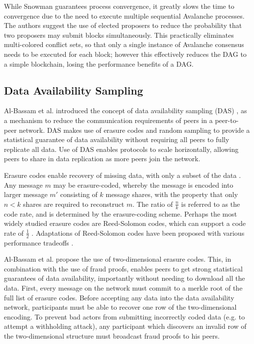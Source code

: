 \documentclass[12pt]{article}
\begin{document}
  While Snowman guarantees process convergence, it greatly slows the time to
  convergence due to the need to execute multiple sequential Avalanche
  processes. The authors suggest the use of elected proposers to reduce the
  probability that two proposers may submit blocks simultaneously. This
  practically eliminates multi-colored conflict sets, so that only a single
  instance of Avalanche consensus needs to be executed for each block; however
  this effectively reduces the DAG to a simple blockchain, losing the
  performance benefits of a DAG.

\subsection{Data Availability Sampling}
  Al-Bassam et al. introduced the concept of data availability sampling (DAS)
  \cite{albassam2019fraud}, as a mechanism to reduce the communication
  requirements of peers in a peer-to-peer network. DAS makes use of erasure
  codes and random sampling to provide a statistical guarantee of data
  availability without requiring all peers to fully replicate all data. Use of
  DAS enables protocols to scale horizontally, allowing peers to share in data
  replication as more peers join the network.

  Erasure codes enable recovery of missing data, with only a subset of the data
  \cite{peterson1972error}. Any message $m$ may be erasure-coded, whereby the
  message is encoded into larger message $m'$ consisting of $k$ message shares,
  with the property that only $n < k$ shares are required to reconstruct $m$.
  The ratio of $\frac{n}{k}$ is referred to as the code rate, and is determined
  by the erasure-coding scheme. Perhaps the most widely studied erasure codes
  are Reed-Solomon codes, which can support a code rate of $\frac{1}{2}$
  \cite{reedsolomon}. Adaptations of Reed-Solomon codes have been proposed with
  various performance tradeoffs \cite{dudek, saints, shea, wu}.

  Al-Bassam et al. propose the use of two-dimensional erasure codes. This, in
  combination with the use of fraud proofs, enables peers to get strong
  statistical guarantees of data availability, importantly without needing to
  download all the data. First, every message on the network must commit to a
  merkle root of the full list of erasure codes. Before accepting any data into
  the data availability network, participants must be able to recover one row
  of the two-dimensional encoding. To prevent bad actors from submitting
  incorrectly coded data (e.g. to attempt a withholding attack), any
  participant which discovers an invalid row of the two-dimensional structure
  must broadcast fraud proofs to his peers.
\end{document}
